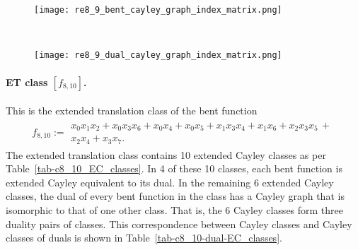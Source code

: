 \documentclass[12pt,a4paper]{article}
\begin{document}
\begin{figure}[!bhpt] %
\centering
\begin{minipage}{.48\textwidth}
  \centering
  \texttt{[image: re8\_9\_bent\_cayley\_graph\_index\_matrix.png]}
  \label{fig:c8_9_bent_cayley_graph_index_matrix}
\end{minipage}
~~
\begin{minipage}{.48\textwidth}
  \centering
  \texttt{[image: re8\_9\_dual\_cayley\_graph\_index\_matrix.png]}
  \label{fig:c8_9_dual_cayley_graph_index_matrix}
\end{minipage}%
\end{figure}
\paragraph*{ET class $[f_{8,10}]$.}
%
This is the extended translation class of the bent function
\small{}
\begin{align*}
f_{ 8 , 10 } :=
\begin{array}{l}
x_{0} x_{1} x_{2} + x_{0} x_{3} x_{6} + x_{0} x_{4} + x_{0} x_{5} + x_{1} x_{3} x_{4} + x_{1} x_{6}
+ x_{2} x_{3} x_{5}\, +
\\
x_{2} x_{4} + x_{3} x_{7}.
\end{array}
\end{align*}
\normalsize{}
The extended translation class contains 10 extended Cayley classes as per Table~\ref{tab-c8_10_EC_classes}.
In 4 of these 10 classes, each bent function is extended Cayley equivalent to its dual.
In the remaining 6 extended Cayley classes, the dual of every bent function in the class has a Cayley graph
that is isomorphic to that of one other class. That is, the 6 Cayley classes form three duality pairs of classes.
This correspondence between Cayley classes and Cayley classes of duals is shown in Table~\ref{tab-c8_10-dual-EC_classes}.
\end{document}
